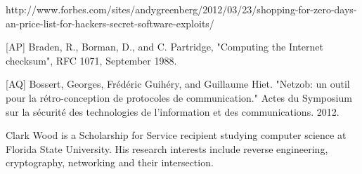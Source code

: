 \documentclass[11pt,expanded,copyright]{fsuthesis}
\begin{document}
\begin{references}
	[AO] http://www.forbes.com/sites/andygreenberg/2012/03/23/shopping-for-zero-days-an-price-list-for-hackers-secret-software-exploits/

	[AP] Braden, R., Borman, D., and C. Partridge, "Computing the Internet checksum", RFC 1071, September 1988.

	[AQ] Bossert, Georges, Frédéric Guihéry, and Guillaume Hiet. "Netzob: un outil pour la rétro-conception de protocoles de communication." Actes du Symposium sur la sécurité des technologies de l'information et des communications. 2012.


\end{references}

%
%

%





% 
% 

\begin{biosketch}
Clark Wood is a Scholarship for Service recipient studying computer science at Florida State University. His research interests include reverse engineering, cryptography, networking and their intersection.
\end{biosketch}
\end{document}
